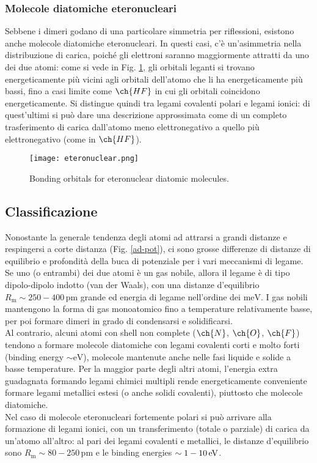 \subsubsection{Molecole diatomiche eteronucleari}

Sebbene i dimeri godano di una particolare simmetria per riflessioni, esistono anche molecole diatomiche eteronucleari. In questi casi, c'è un'asimmetria nella distribuzione di carica, poiché gli elettroni saranno maggiormente attratti da uno dei due atomi: come si vede in Fig. \ref{etero}, gli orbitali leganti si trovano energeticamente più vicini agli orbitali dell'atomo che li ha energeticamente più bassi, fino a casi limite come $ \ch{HF} $ in cui gli orbitali coincidono energeticamente. Si distingue quindi tra legami covalenti polari e legami ionici: di quest'ultimi si può dare una descrizione approssimata come di un completo trasferimento di carica dall'atomo meno elettronegativo a quello più elettronegativo (come in $ \ch{HF} $).

\begin{figure}
	\centering
	\texttt{[image: eteronuclear.png]}
	\caption{Bonding orbitals for eteronuclear diatomic molecules.}
	\label{etero}
\end{figure}

\subsection{Classificazione}

Nonostante la generale tendenza degli atomi ad attrarsi a grandi distanze e respingersi a corte distanza (Fig. \ref{ad-pot}), ci sono grosse differenze di distanze di equilibrio e profondità della buca di potenziale per i vari meccanismi di legame. \\
Se uno (o entrambi) dei due atomi è un gas nobile, allora il legame è di tipo dipolo-dipolo indotto (van der Waals), con una distanze d'equilibrio $ R_\text{m} \sim 250-400 \,\text{pm} $ grande ed energia di legame nell'ordine dei $ \text{meV} $. I gas nobili mantengono la forma di gas monoatomico fino a temperature relativamente basse, per poi formare dimeri in grado di condensarsi e solidificarsi. \\
Al contrario, alcuni atomi con shell non complete ($ \ch{N} $, $ \ch{O} $, $ \ch{F} $) tendono a formare molecole diatomiche con legami covalenti corti e molto forti (binding energy $ \sim \text{eV} $), molecole mantenute anche nelle fasi liquide e solide a basse temperature. Per la maggior parte degli altri atomi, l'energia extra guadagnata formando legami chimici multipli rende energeticamente conveniente formare legami metallici estesi (o anche solidi covalenti), piuttosto che molecole diatomiche.\\
Nel caso di molecole eteronucleari fortemente polari si può arrivare alla formazione di legami ionici, con un transferimento (totale o parziale) di carica da un'atomo all'altro: al pari dei legami covalenti e metallici, le distanze d'equilibrio sono $ R_\text{m} \sim 80-250 \,\text{pm} $ e le binding energies $ \sim 1-10\,\mathrm{eV} $.










